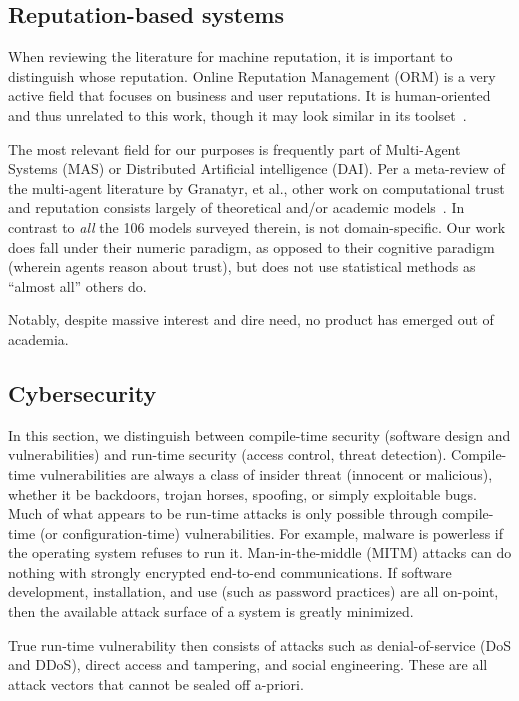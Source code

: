 \subsection{Reputation-based systems}\label{subsec:reputation}

When reviewing the literature for machine reputation, it is important to distinguish whose reputation.
Online Reputation Management (ORM) is a very active field that focuses on business and user reputations.
It is human-oriented and thus unrelated to this work, though it may look similar in its toolset~\cite{hasan2022privacy}.

The most relevant field for our purposes is frequently part of Multi-Agent Systems (MAS) or Distributed Artificial intelligence (DAI).
Per a meta-review of the multi-agent literature by Granatyr, et al., other work on computational trust and reputation consists largely of theoretical and/or academic models~\cite{granatyr2015trust}.
In contrast to \emph{all} the 106 models surveyed therein, \projectName is not domain-specific.
Our work does fall under their numeric paradigm, as opposed to their cognitive paradigm (wherein agents reason about trust), but does not use statistical methods as ``almost all'' others do.

Notably, despite massive interest and dire need, no product has emerged out of academia.


\subsection{Cybersecurity}\label{subsec:cyber}

In this section, we distinguish between compile-time security (software design and vulnerabilities) and run-time security (access control, threat detection).
Compile-time vulnerabilities are always a class of insider threat (innocent or malicious), whether it be backdoors, trojan horses, spoofing, or simply exploitable bugs.
Much of what appears to be run-time attacks is only possible through compile-time (or configuration-time) vulnerabilities.
For example, malware is powerless if the operating system refuses to run it.
Man-in-the-middle (MITM) attacks can do nothing with strongly encrypted end-to-end communications.
If software development, installation, and use (such as password practices) are all on-point, then the available attack surface of a system is greatly minimized.

True run-time vulnerability then consists of attacks such as denial-of-service (DoS and DDoS), direct access and tampering, and social engineering.
These are all attack vectors that cannot be sealed off a-priori.

